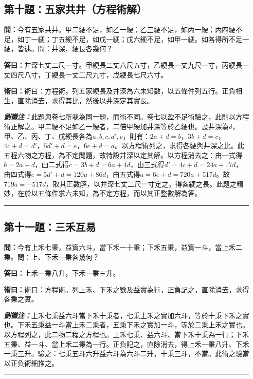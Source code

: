 \documentclass[11pt,a4paper]{article}
\newcommand{\wen}[1]{\textbf{\color{problemcolor}問：}#1\par}
\newcommand{\da}[1]{\textbf{答曰：}#1\par}
\newcommand{\shu}[1]{\textbf{術曰：}#1\par}
\newcommand{\liuhui}[1]{{\color{commentarycolor}\textit{\textbf{劉徽注：}}#1\par}}
\begin{document}
\subsection{第十題：五家共井（方程術解）}

\wen{今有五家共井。甲二綆不足，如乙一綆；乙三綆不足，如丙一綆；丙四綆不足，如丁一綆；丁五綆不足，如戊一綆；戊六綆不足，如甲一綆。如各得所不足一綆，皆逮。問：井深、綆長各幾何？}

\da{井深七丈二尺一寸。甲綆長二丈六尺五寸，乙綆長一丈九尺一寸，丙綆長一丈四尺八寸，丁綆長一丈二尺九寸，戊綆長七尺六寸。}

\shu{術曰：方程術。列五家綆長及井深為六未知數，以五條件列五行。正負相生，直除消去，求得其比，然後以井深定其實長。}

\liuhui{此題與卷七所載為同一題，而術不同。卷七以盈不足術驗之，此則以方程術正解之。甲二綆不足如乙一綆者，二倍甲綆加井深等於乙綆也。設井深為$d$，甲、乙、丙、丁、戊綆長各為$a, b, c, d', e$，則有：$2a + d = b$，$3b + d = c$，$4c + d = d'$，$5d' + d = e$，$6e + d = a$。以方程術列之，求得各綆與井深之比。此五程六物之方程，為不定問題，故特設井深以定其解。以方程消去之：由一式得$b = 2a + d$，由二式得$c = 3b + d = 6a + 4d$，由三式得$d' = 4c + d = 24a + 17d$，由四式得$e = 5d' + d = 120a + 86d$，由五式得$a = 6e + d = 720a + 517d$。故$719a = -517d$，取其正數解，以井深七丈二尺一寸定之，得各綆之長。此題之精妙，在於以五條件求六未知，為不定方程，而以其正整數解為答。}

\bigskip
\hrule
\bigskip

\subsection{第十一題：三禾互易}

\wen{今有上禾七秉，益實六斗，當下禾一十秉；下禾五秉，益實一斗，當上禾二秉。問：上、下禾一秉各幾何？}

\da{上禾一秉八升，下禾一秉三升。}

\shu{術曰：方程術。列上禾、下禾之數及益實為行，正負記之，直除消去，求得各秉之實。}

\liuhui{上禾七秉益六斗當下禾十秉者，七秉上禾之實加六斗，等於十秉下禾之實也。下禾五秉益一斗當上禾二秉者，五秉下禾之實加一斗，等於二秉上禾之實也。以方程列之，此二物二程之方程也。上禾七秉、益六斗、當下禾十秉為一行；下禾五秉、益一斗、當上禾二秉為一行。正負記之，直除消去，得上禾一秉八升、下禾一秉三升。驗之：七秉五斗六升益六斗為六斗二升，十秉三斗，不當。此術之驗當以正負術細推之。}

\bigskip
\hrule
\bigskip
\end{document}
